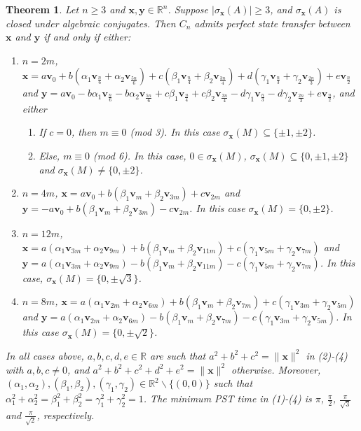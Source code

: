 \documentclass[11pt]{article}
\newtheorem{theorem}{Theorem}
\newcommand{\bv}{\mathbf v}
\newcommand{\bx}{\mathbf x}
\newcommand{\by}{\mathbf y}
\def\R{\mathbb{R}}
\begin{document}
\begin{theorem}
\label{Thm:pstcycles}
Let $n\geq 3$ and $\bx,\by\in\R^n$. Suppose $|\sigma_{\bx}(A)|\geq 3$, and $\sigma_{\bx}(A)$ is closed under algebraic conjugates. Then $C_n$ admits perfect state transfer between $\bx$ and $\by$ if and only if either:
\begin{enumerate}

\item $n=2m$, $\bx=a\bv_0+b(\alpha_1\bv_{\frac{n}{6}}+\alpha_2\bv_{\frac{5n}{6}})+c(\beta_1\bv_{\frac{n}{4}}+\beta_2\bv_{\frac{3n}{4}})+d(\gamma_1\bv_{\frac{n}{3}}+\gamma_2\bv_{\frac{2n}{3}})+e\bv_{\frac{n}{2}}$    
and $\by=a\bv_0-b\alpha_1\bv_{\frac{n}{6}}-b\alpha_2\bv_{\frac{5n}{6}}+c\beta_1\bv_{\frac{n}{4}}+c\beta_2\bv_{\frac{3n}{4}}-d\gamma_1\bv_{\frac{n}{3}}-d\gamma_2\bv_{\frac{2n}{3}}+e\bv_{\frac{n}{2}}$,
and either
\begin{enumerate}
\item If $c=0$, then $m\equiv 0$ (mod 3). In this case $\sigma_{\bx}(M)\subseteq\{\pm 1,\pm 2\}$.
\item Else, $m\equiv 0$ (mod 6). In this case, $0\in \sigma_{\bx}(M)$, $\sigma_{\bx}(M)\subseteq\{0,\pm 1,\pm 2\}$ and $\sigma_{\bx}(M)\neq \{0,\pm 2\}$.
\end{enumerate}

\item $n=4m$, $\bx=a\bv_0+b(\beta_1\bv_{m}+\beta_2\bv_{3m})+c\bv_{2m}$    
and $\by=-a\bv_0+b(\beta_1\bv_{m}+\beta_2\bv_{3m})-c\bv_{2m}$. In this case $\sigma_{\bx}(M)=\{ 0,\pm 2\}$.

\item $n=12m$, $\bx=a(\alpha_1\bv_{3m}+\alpha_2\bv_{9m})+b(\beta_1\bv_{m}+\beta_2\bv_{11m})+c(\gamma_1\bv_{5m}+\gamma_2\bv_{7m})$ and  $\by=a(\alpha_1\bv_{3m}+\alpha_2\bv_{9m})-b(\beta_1\bv_{m}+\beta_2\bv_{11m})-c(\gamma_1\bv_{5m}+\gamma_2\bv_{7m})$. In this case, $\sigma_{\bx}(M)=\{ 0,\pm \sqrt{3}\}$.

\item $n=8m$, $\bx=a(\alpha_1\bv_{2m}+\alpha_2\bv_{6m})+b(\beta_1\bv_{m}+\beta_2\bv_{7m})+c(\gamma_1\bv_{3m}+\gamma_2\bv_{5m})$ and $\by=a(\alpha_1\bv_{2m}+\alpha_2\bv_{6m})-b(\beta_1\bv_{m}+\beta_2\bv_{7m})-c(\gamma_1\bv_{3m}+\gamma_2\bv_{5m})$. In this case $\sigma_{\bx}(M)=\{ 0,\pm \sqrt{2}\}$.
\end{enumerate}
In all cases above, $a,b,c,d,e\in\R$ are such that $a^2+b^2+c^2=\|\bx\|^2$ in (2)-(4) with $a,b,c\neq 0$, and $a^2+b^2+c^2+d^2+e^2=\|\bx\|^2$ otherwise. Moreover, $(\alpha_1,\alpha_2),(\beta_1,\beta_2),(\gamma_1,\gamma_2)\in \R^2\backslash\{(0,0)\}$ such that $\alpha_1^2+\alpha_2^2=\beta_1^2+\beta_2^2=\gamma_1^2+\gamma_2^2=1$. The minimum PST time in (1)-(4) is $\pi$, $\frac{\pi}{2}$, $\frac{\pi}{\sqrt{3}}$ and $\frac{\pi}{\sqrt{2}}$, respectively.
\end{theorem}
\end{document}
